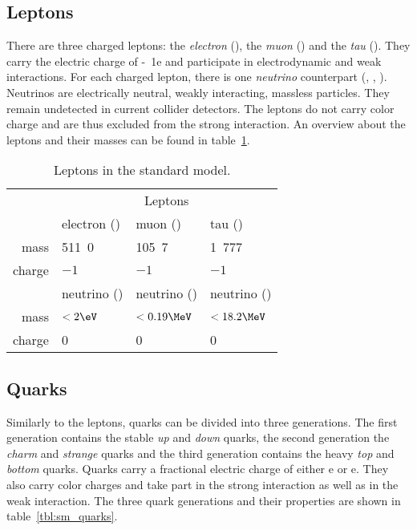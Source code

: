 \subsection{Leptons}
There are three charged leptons: the \emph{electron} (\Pe), the \emph{muon} (\Pmu) and the \emph{tau} (\Ptau). They carry the electric charge of \unit{-1}{e} and participate in electrodynamic and weak interactions. For each charged lepton, there is one \emph{neutrino} counterpart (\Pnue, \Pnum, \Pnut). Neutrinos are electrically neutral, weakly interacting, massless particles. They remain undetected in current collider detectors.
The leptons do not carry color charge and are thus excluded from the strong interaction.
An overview about the leptons and their masses can be found in table~\ref{tbl:sm_leptons}.

\begin{table}[htb]
	\centering
	\begin{tabular}{ r | l | l | l | }
		\cline{2-4}
		& \multicolumn{3}{c|}{Leptons} \\ \cline{2-4}
		& electron (\Pe) & muon (\Pmu) & tau (\Ptau) \\ %
		mass & \unit{511.0}{\keV} & \unit{105.7}{\MeV} & \unit{1.777}{\GeV} \\ %
		charge & $-1$ & $-1$ & $-1$ \\ \cline{2-4}
		& \Pe neutrino (\Pnue) & \Pmu neutrino (\Pnum) & \Ptau neutrino (\Pnut) \\ %
		mass & $< \unit{2}{\eV}$ & $< \unit{0.19}{\MeV}$ & $< \unit{18.2}{\MeV}$ \\ %
		charge & 0 & 0 & 0 \\ \cline{2-4}
	\end{tabular}
	\caption{Leptons in the standard model\cite[p.~30, p.~690f.]{Oo2014Review}.}
	\label{tbl:sm_leptons}
\end{table}

\subsection{Quarks}
Similarly to the leptons, quarks can be divided into three generations. The first generation contains the stable \emph{up} and \emph{down} quarks, the second generation the \emph{charm} and \emph{strange} quarks and the third generation contains the heavy \emph{top} and \emph{bottom} quarks. Quarks carry a fractional electric charge of either \unit{}{e} or \unit{}{e}.
They also carry color charges and take part in the strong interaction as well as in the weak interaction.
The three quark generations and their properties are shown in table~\ref{tbl:sm_quarks}.

